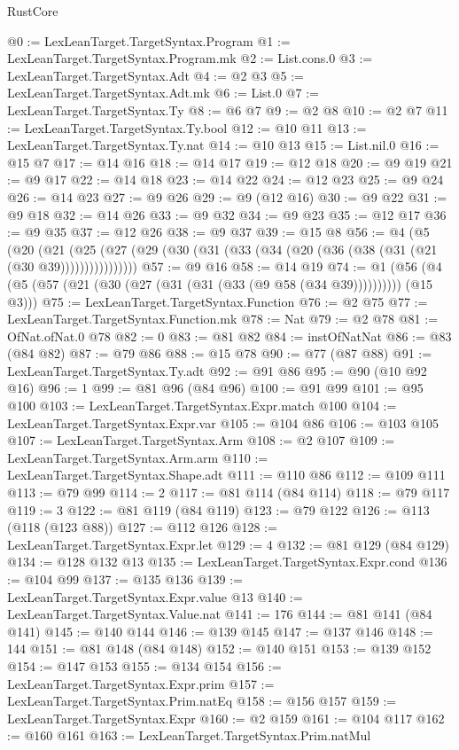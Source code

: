 \begin{lexlean}{RustCore}
\begin{coremodule}
@0 := LexLeanTarget.TargetSyntax.Program
@1 := LexLeanTarget.TargetSyntax.Program.mk
@2 := List.cons.{0}
@3 := LexLeanTarget.TargetSyntax.Adt
@4 := @2 @3
@5 := LexLeanTarget.TargetSyntax.Adt.mk
@6 := List.{0}
@7 := LexLeanTarget.TargetSyntax.Ty
@8 := @6 @7
@9 := @2 @8
@10 := @2 @7
@11 := LexLeanTarget.TargetSyntax.Ty.bool
@12 := @10 @11
@13 := LexLeanTarget.TargetSyntax.Ty.nat
@14 := @10 @13
@15 := List.nil.{0}
@16 := @15 @7
@17 := @14 @16
@18 := @14 @17
@19 := @12 @18
@20 := @9 @19
@21 := @9 @17
@22 := @14 @18
@23 := @14 @22
@24 := @12 @23
@25 := @9 @24
@26 := @14 @23
@27 := @9 @26
@29 := @9 (@12 @16)
@30 := @9 @22
@31 := @9 @18
@32 := @14 @26
@33 := @9 @32
@34 := @9 @23
@35 := @12 @17
@36 := @9 @35
@37 := @12 @26
@38 := @9 @37
@39 := @15 @8
@56 := @4
    (@5
      (@20 (@21 (@25 (@27 (@29 (@30 (@31 (@33 (@34 (@20 (@36 (@38 (@31 (@21 (@30 @39))))))))))))))))
@57 := @9 @16
@58 := @14 @19
@74 := @1 (@56 (@4 (@5 (@57 (@21 (@30 (@27 (@31 (@31 (@33 (@9 @58 (@34 @39)))))))))) (@15 @3)))
@75 := LexLeanTarget.TargetSyntax.Function
@76 := @2 @75
@77 := LexLeanTarget.TargetSyntax.Function.mk
@78 := Nat
@79 := @2 @78
@81 := OfNat.ofNat.{0} @78
@82 := 0
@83 := @81 @82
@84 := instOfNatNat
@86 := @83 (@84 @82)
@87 := @79 @86
@88 := @15 @78
@90 := @77 (@87 @88)
@91 := LexLeanTarget.TargetSyntax.Ty.adt
@92 := @91 @86
@95 := @90 (@10 @92 @16)
@96 := 1
@99 := @81 @96 (@84 @96)
@100 := @91 @99
@101 := @95 @100
@103 := LexLeanTarget.TargetSyntax.Expr.match @100
@104 := LexLeanTarget.TargetSyntax.Expr.var
@105 := @104 @86
@106 := @103 @105
@107 := LexLeanTarget.TargetSyntax.Arm
@108 := @2 @107
@109 := LexLeanTarget.TargetSyntax.Arm.arm
@110 := LexLeanTarget.TargetSyntax.Shape.adt
@111 := @110 @86
@112 := @109 @111
@113 := @79 @99
@114 := 2
@117 := @81 @114 (@84 @114)
@118 := @79 @117
@119 := 3
@122 := @81 @119 (@84 @119)
@123 := @79 @122
@126 := @113 (@118 (@123 @88))
@127 := @112 @126
@128 := LexLeanTarget.TargetSyntax.Expr.let
@129 := 4
@132 := @81 @129 (@84 @129)
@134 := @128 @132 @13
@135 := LexLeanTarget.TargetSyntax.Expr.cond
@136 := @104 @99
@137 := @135 @136
@139 := LexLeanTarget.TargetSyntax.Expr.value @13
@140 := LexLeanTarget.TargetSyntax.Value.nat
@141 := 176
@144 := @81 @141 (@84 @141)
@145 := @140 @144
@146 := @139 @145
@147 := @137 @146
@148 := 144
@151 := @81 @148 (@84 @148)
@152 := @140 @151
@153 := @139 @152
@154 := @147 @153
@155 := @134 @154
@156 := LexLeanTarget.TargetSyntax.Expr.prim
@157 := LexLeanTarget.TargetSyntax.Prim.natEq
@158 := @156 @157
@159 := LexLeanTarget.TargetSyntax.Expr
@160 := @2 @159
@161 := @104 @117
@162 := @160 @161
@163 := LexLeanTarget.TargetSyntax.Prim.natMul

\end{coremodule}
\end{lexlean}

